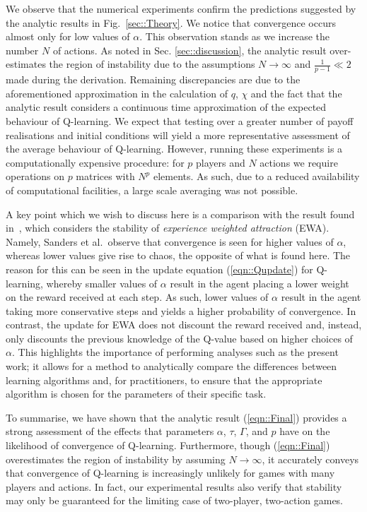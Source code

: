 \documentclass{article}
\begin{document}
We observe that the numerical experiments confirm the predictions
suggested by the analytic results in Fig.~\ref{sec::Theory}. We notice that convergence occurs almost only for
low values of $\alpha$. This observation stands as we increase the
number $N$ of actions. As noted in Sec. \ref{sec::discussion}, the analytic result over-estimates the region
of instability due to the assumptions $N \rightarrow \infty$ and
$\frac{1}{p-1} \ll 2$ made during the derivation. Remaining
discrepancies are due to the aforementioned approximation in
the calculation of $q$, $\chi$ and the fact that the analytic result
considers a continuous time approximation of the expected behaviour of
Q-learning. We expect that testing over a greater number of payoff
realisations and initial conditions will yield a more representative
assessment of the average behaviour of Q-learning. However, running
these experiments is a computationally expensive procedure: for $p$
players and $N$ actions we require operations on $p$ matrices with
$N^{p}$ elements. As such, due to a reduced availability of
computational facilities, a large scale averaging was not possible.

A key point which we wish to discuss here is a comparison with the result
found in~\cite{sanders:prevalence}, which considers the stability of
\textit{experience weighted attraction} (EWA). Namely, Sanders et
al.~observe that convergence is seen for higher values of $\alpha$,
whereas lower values give rise to chaos, the opposite of what is found
here. The reason for this can be seen in the update equation
(\ref{eqn::Qupdate}) for Q-learning, whereby smaller values of
$\alpha$ result in the agent placing a lower weight on the reward
received at each step. As such, lower values of $\alpha$ result in the
agent taking more conservative steps and yields a higher probability
of convergence. In contrast, the update for EWA does not discount the
reward received and, instead, only discounts the previous
knowledge of the Q-value based on higher choices of $\alpha$.  This
highlights the importance of performing analyses such as the present
work; it allows for a method to analytically compare the differences
between learning algorithms and, for practitioners, to ensure that the
appropriate algorithm is chosen for the parameters of their specific
task.

To summarise, we have shown that the analytic result
(\ref{eqn::Final}) provides a strong assessment of the effects that
parameters $\alpha$, $\tau$, $\Gamma$, and $p$ have on the likelihood of
convergence of Q-learning. Furthermore, though
(\ref{eqn::Final}) overestimates the region of instability by assuming $N \rightarrow \infty$, it
accurately conveys that convergence of Q-learning is increasingly unlikely for
games with many players and actions. In fact, our experimental results
also verify that stability may only be guaranteed for the limiting
case of two-player, two-action games.
%
\end{document}
